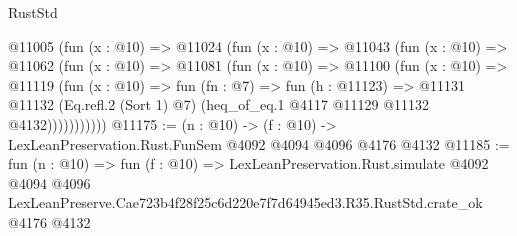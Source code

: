 \begin{lexlean}{RustStd}
\begin{coremodule}
        @11005
          (fun (x : @10) =>
          @11024
            (fun (x : @10) =>
            @11043
              (fun (x : @10) =>
              @11062
                (fun (x : @10) =>
                @11081
                  (fun (x : @10) =>
                  @11100
                    (fun (x : @10) =>
                    @11119
                      (fun (x : @10) =>
                      fun (fn : @7) =>
                      fun (h : @11123) =>
                      @11131
                        @11132
                        (Eq.refl.{2} (Sort 1) @7)
                        (heq_of_eq.{1} @4117 @11129 @11132 @4132)))))))))))
@11175 := (n : @10) -> (f : @10) -> LexLeanPreservation.Rust.FunSem @4092 @4094 @4096 @4176 @4132
@11185 := fun (n : @10) =>
  fun (f : @10) =>
  LexLeanPreservation.Rust.simulate
    @4092
    @4094
    @4096
    LexLeanPreserve.Cae723b4f28f25c6d220e7f7d64945ed3.R35.RustStd.crate_ok
    @4176
    @4132
\end{coremodule}
\end{lexlean}
